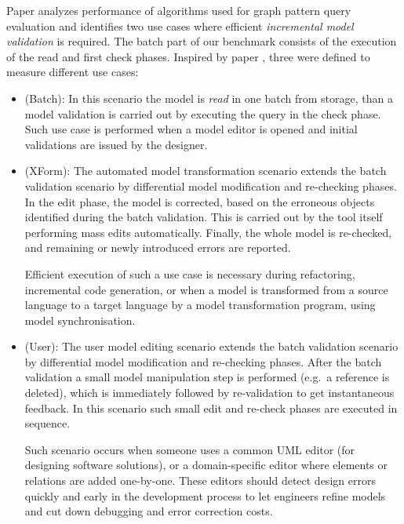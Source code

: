 Paper \cite{icgt08-bhrv} analyzes performance of algorithms used for graph
pattern query evaluation and identifies two use cases where efficient
\emph{incremental model validation} is required. The batch part of our benchmark
consists of the execution of the read and first check phases. Inspired by paper
\cite{icgt08-bhrv}, three  were defined to measure different
use cases:
\begin{itemize}
  
  \item {} (\textsf{Batch}):
  In this scenario the model is \emph{read} in one batch from storage, than a model validation is carried out by executing the query in the check phase. Such use case is performed when a model editor is opened and initial validations are issued by the designer. 
  
  \item {} (\textsf{XForm}):
  The automated model transformation scenario extends the batch validation scenario by differential model modification and re-checking phases. In the edit phase, the model is corrected, based on the erroneous objects identified during the batch validation. This is carried out by the tool itself performing mass edits automatically. Finally, the whole model is re-checked, and remaining or newly introduced errors are reported. 
  
  Efficient execution of such a use case is necessary during refactoring, incremental code generation, or when a model is transformed from a source language to a target language by a model transformation program, using model synchronisation.
  
  \item {} (\textsf{User}):
  The user model editing scenario extends the batch validation scenario by differential model modification and re-checking phases. After the batch validation a small model manipulation step is performed (e.g.\ a reference is deleted), which is immediately followed by re-validation to get instantaneous feedback.  In this scenario such small edit and re-check phases are executed in sequence.
  
  Such scenario occurs when someone uses a common UML editor (for designing software solutions), or a domain-specific editor where elements or relations are added one-by-one. These editors should detect design errors quickly and early in the development process to let engineers refine models and cut down debugging and error correction costs.
  
\end{itemize}


